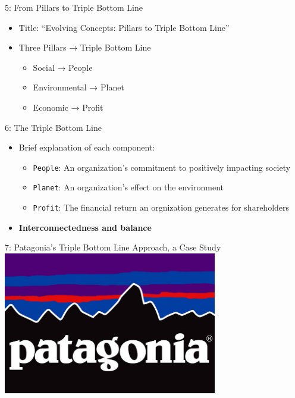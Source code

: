 \documentclass[
  ignorenonframetext,
]{beamer}
\providecommand{\tightlist}{%
  \setlength{\itemsep}{0pt}\setlength{\parskip}{0pt}}\usepackage{longtable,booktabs,array}
\begin{document}
\begin{frame}{5: From Pillars to Triple Bottom Line}
\label{from-pillars-to-triple-bottom-line}
\begin{itemize}
\tightlist
\item
  Title: ``Evolving Concepts: Pillars to Triple Bottom Line''
\item
  Three Pillars → Triple Bottom Line

  \begin{itemize}
  \tightlist
  \item
    Social → People
  \item
    Environmental → Planet
  \item
    Economic → Profit
  \end{itemize}
\end{itemize}
\end{frame}

\begin{frame}[fragile]{6: The Triple Bottom Line}
\label{the-triple-bottom-line}
\begin{itemize}
\tightlist
\item
  Brief explanation of each component:

  \begin{itemize}
  \tightlist
  \item
    \texttt{People}: An organization's commitment to positively
    impacting society
  \item
    \texttt{Planet}: An organization's effect on the environment
  \item
    \texttt{Profit}: The financial return an orgnization generates for
    shareholders
  \end{itemize}
\item
  \textbf{Interconnectedness and balance}
\end{itemize}
\end{frame}

\begin{frame}{7: Patagonia's Triple Bottom Line Approach, a Case Study}
\label{patagonias-triple-bottom-line-approach-a-case-study}
\includegraphics[width=0.7\textwidth,height=\textheight]{asset/patagonia-logo-720.jpg}
\end{frame}
\end{document}
